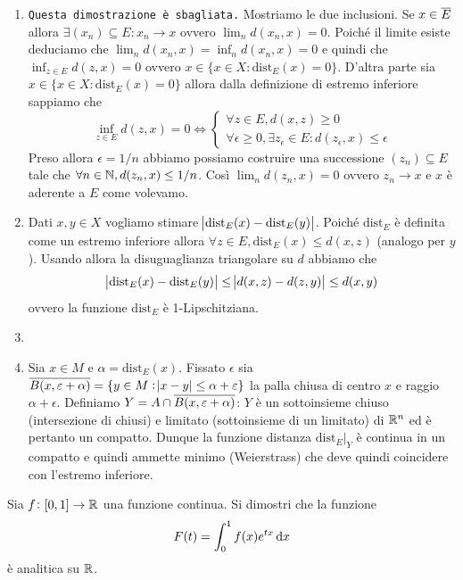 \documentclass[a4paper]{article}\par \usepackage{style}\par
\begin{document}
\begin{enumerate}[label = (\roman*)]
\item \texttt{Questa dimostrazione è sbagliata.} Mostriamo le due inclusioni. Se $ x \in \overline{E} $ allora $ \exists (x_n) \subseteq E : x_n \to x $ ovvero $ \lim_{n} d(x_n, x) = 0 $. Poiché il limite esiste deduciamo che $ \lim_{n} d(x_n, x) = \inf_{n} d(x_n, x) = 0 $ e quindi che $ \inf_{z \in E} d(z, x) = 0 $ ovvero $ x \in \{x \in X : \mathrm{dist}_E(x) = 0\} $. D'altra parte sia $ x \in \{x \in X : \mathrm{dist}_E(x) = 0\} $ allora dalla definizione di estremo inferiore sappiamo che
  \[\inf_{z \in E} d(z, x) = 0 \iff
    \begin{cases}
      \forall z \in E, d(x, z) \geq 0 \\
      \forall \epsilon \geq 0, \exists z_\epsilon \in E : d(z_{\epsilon}, x) \leq \epsilon
    \end{cases}\]
  Preso allora $ \epsilon = 1/n $ abbiamo possiamo costruire una successione $ (z_n) \subseteq E $ tale che $ \forall n \in \mathbb{N}, d(z_n, x) \leq 1/n $. Così $ \lim_n d(z_n, x) = 0 $ ovvero $ z_n \to x $ e $ x $ è aderente a $ E $ come volevamo.
\item Dati $ x, y \in X $ vogliamo stimare $ \abs{\mathrm{dist}_E(x) - \mathrm{dist}_E(y)} $. Poiché $ \mathrm{dist}_E $ è definita come un estremo inferiore allora $ \forall z \in E, \mathrm{dist}_E(x) \leq d(x, z) $ (analogo per $ y $). Usando allora la disuguaglianza triangolare su $ d $ abbiamo che \[\abs{\mathrm{dist}_E(x) - \mathrm{dist}_E(y)} \leq \abs{d(x, z) - d(z, y)} \leq d(x, y)\] ovvero la funzione $ \mathrm{dist}_E $ è 1-Lipschitziana.
\item
\item Sia $ x \in M $ e $ \alpha = \mathrm{dist}_E(x) $. Fissato $ \epsilon $ sia $ \overline{B(x, \varepsilon + \alpha)} = \{y \in M : \abs{x - y} \leq \alpha + \varepsilon\} $ la palla chiusa di centro $ x $ e raggio $ \alpha + \epsilon $. Definiamo $ Y = A \cap \overline{B(x, \varepsilon + \alpha)} $: $ Y $ è un sottoinsieme chiuso (intersezione di chiusi) e limitato (sottoinsieme di un limitato) di $ \mathbb{R}^n $ ed è pertanto un compatto. Dunque la funzione distanza $ \mathrm{dist}_E|_{Y} $ è continua in un compatto e quindi ammette minimo (Weierstrass) che deve quindi coincidere con l'estremo inferiore.
\end{enumerate}\par \begin{vares}
  Sia $ f \colon [0, 1] \to \mathbb{R} $ una funzione continua. Si dimostri che la funzione \[F(t) = \int_{0}^{1} f(x) e^{tx} \dif{x}\] è analitica su $ \mathbb{R} $.

\end{vares}
\end{document}
